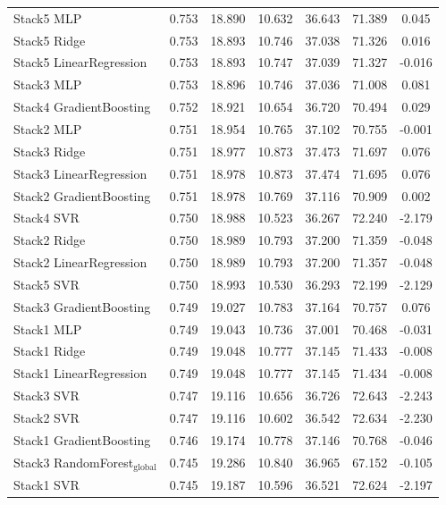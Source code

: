 \begin{table}
{\begin{tabular}{p{4.5cm}cccccc}
        Stack5 MLP & 0.753 & 18.890 & 10.632 & 36.643 & 71.389 & 0.045 \\
        Stack5 Ridge & 0.753 & 18.893 & 10.746 & 37.038 & 71.326 & 0.016 \\
        Stack5 LinearRegression & 0.753 & 18.893 & 10.747 & 37.039 & 71.327 & -0.016 \\
        Stack3 MLP & 0.753 & 18.896 & 10.746 & 37.036 & 71.008 & 0.081 \\
        Stack4 GradientBoosting & 0.752 & 18.921 & 10.654 & 36.720 & 70.494 & 0.029 \\
        Stack2 MLP & 0.751 & 18.954 & 10.765 & 37.102 & 70.755 & -0.001 \\
        Stack3 Ridge & 0.751 & 18.977 & 10.873 & 37.473 & 71.697 & 0.076 \\
        Stack3 LinearRegression & 0.751 & 18.978 & 10.873 & 37.474 & 71.695 & 0.076 \\
        Stack2 GradientBoosting & 0.751 & 18.978 & 10.769 & 37.116 & 70.909 & 0.002 \\
        Stack4 SVR & 0.750 & 18.988 & 10.523 & 36.267 & 72.240 & -2.179 \\
        Stack2 Ridge & 0.750 & 18.989 & 10.793 & 37.200 & 71.359 & -0.048 \\
        Stack2 LinearRegression & 0.750 & 18.989 & 10.793 & 37.200 & 71.357 & -0.048 \\
        Stack5 SVR & 0.750 & 18.993 & 10.530 & 36.293 & 72.199 & -2.129 \\
        Stack3 GradientBoosting & 0.749 & 19.027 & 10.783 & 37.164 & 70.757 & 0.076 \\
        Stack1 MLP & 0.749 & 19.043 & 10.736 & 37.001 & 70.468 & -0.031 \\
        Stack1 Ridge & 0.749 & 19.048 & 10.777 & 37.145 & 71.433 & -0.008 \\
        Stack1 LinearRegression & 0.749 & 19.048 & 10.777 & 37.145 & 71.434 & -0.008 \\
        Stack3 SVR & 0.747 & 19.116 & 10.656 & 36.726 & 72.643 & -2.243 \\
        Stack2 SVR & 0.747 & 19.116 & 10.602 & 36.542 & 72.634 & -2.230 \\
        Stack1 GradientBoosting & 0.746 & 19.174 & 10.778 & 37.146 & 70.768 & -0.046 \\
        Stack3 RandomForest$_{\text{global}}$ & 0.745 & 19.286 & 10.840 & 36.965 & 67.152 & -0.105 \\
        Stack1 SVR & 0.745 & 19.187 & 10.596 & 36.521 & 72.624 & -2.197 \\

\end{tabular}}
\end{table}
